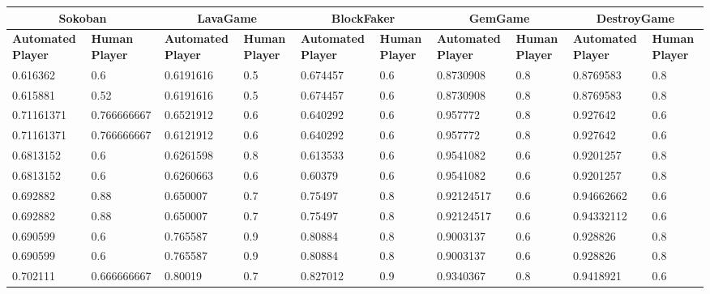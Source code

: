 
\begin{landscape}
\begin{table}[!ht]
	\centering
	\begin{tabular}{|p{0.8in}|p{0.8in}|p{0.8in}|p{0.8in}|p{0.8in}|p{0.8in}|p{0.8in}|p{0.8in}|p{0.8in}|p{0.8in}|}
		\hline
		\multicolumn{2}{c}{\textbf{Sokoban}} & \multicolumn{2}{c}{\textbf{LavaGame}} & \multicolumn{2}{c}{\textbf{\textbf{BlockFaker}}} & \multicolumn{2}{c}{\textbf{GemGame}} & \multicolumn{2}{c}{\textbf{DestroyGame}}\\
		\hline
		\textbf{Automated Player} & \textbf{Human Player} & \textbf{Automated Player} & \textbf{Human Player} & \textbf{Automated Player} & \textbf{Human Player} & \textbf{Automated Player} & \textbf{Human Player} & \textbf{Automated Player} & \textbf{Human Player}\\
		\hline
		0.616362 & 0.6 & 0.6191616 & 0.5 & 0.674457 & 0.6 & 0.8730908 & 0.8 & 0.8769583 & 0.8\\
		\hline
		0.615881 & 0.52 & 0.6191616 & 0.5 & 0.674457 & 0.6 & 0.8730908 & 0.8 & 0.8769583 & 0.8\\
		\hline
		0.71161371 & 0.766666667 & 0.6521912 & 0.6 & 0.640292 & 0.6 & 0.957772 & 0.8 & 0.927642 & 0.6\\
		\hline
		0.71161371 & 0.766666667 & 0.6121912 & 0.6 & 0.640292 & 0.6 & 0.957772 & 0.8 & 0.927642 & 0.6\\
		\hline
		0.6813152 & 0.6 & 0.6261598 & 0.8 & 0.613533 & 0.6 & 0.9541082 & 0.6 & 0.9201257 & 0.8\\
		\hline
		0.6813152 & 0.6 & 0.6260663 & 0.6 & 0.60379 & 0.6 & 0.9541082 & 0.6 & 0.9201257 & 0.8\\
		\hline
		0.692882 & 0.88 & 0.650007 & 0.7 & 0.75497 & 0.8 & 0.92124517 & 0.6 & 0.94662662 & 0.6\\
		\hline
		0.692882 & 0.88 & 0.650007 & 0.7 & 0.75497 & 0.8 & 0.92124517 & 0.6 & 0.94332112 & 0.6\\
		\hline
		0.690599 & 0.6 & 0.765587 & 0.9 & 0.80884 & 0.8 & 0.9003137 & 0.6 & 0.928826 & 0.8\\
		\hline
		0.690599 & 0.6 & 0.765587 & 0.9 & 0.80884 & 0.8 & 0.9003137 & 0.6 & 0.928826 & 0.8\\
		\hline
		0.702111 & 0.666666667 & 0.80019 & 0.7 & 0.827012 & 0.9 & 0.9340367 & 0.8 & 0.9418921 & 0.6\\
		\hline

\end{tabular}
\end{table}
\end{landscape}

